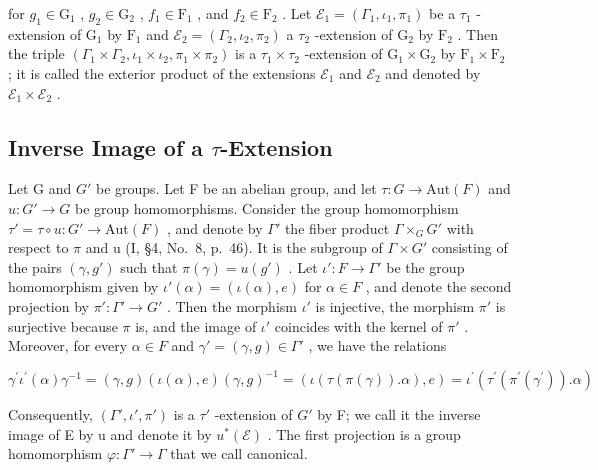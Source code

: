 for \(g_{1} \in \mathrm{G}_{1}\) , \(g_{2} \in \mathrm{G}_{2}\) , \(f_{1} \in \mathrm{F}_{1}\) , and \(f_{2} \in \mathrm{F}_{2}\) . Let \(\mathcal{E}_1 = (\Gamma_1, \iota_1, \pi_1)\) be a \(\tau_1\) -extension of \(\mathrm{G}_1\) by \(\mathrm{F}_1\) and \(\mathcal{E}_2 = (\Gamma_2, \iota_2, \pi_2)\) a \(\tau_2\) -extension of \(\mathrm{G}_2\) by \(\mathrm{F}_2\) . Then the triple \((\Gamma_1 \times \Gamma_2, \iota_1 \times \iota_2, \pi_1 \times \pi_2)\) is a \(\tau_1 \times \tau_2\) -extension of \(\mathrm{G}_1 \times \mathrm{G}_2\) by \(\mathrm{F}_1 \times \mathrm{F}_2\) ; it is called the exterior product of the extensions \(\mathcal{E}_1\) and \(\mathcal{E}_2\) and denoted by \(\mathcal{E}_1 \times \mathcal{E}_2\) .

\subsection{\texorpdfstring{Inverse Image of a \(\tau\)-Extension}{Inverse Image of a \textbackslash tau-Extension}}

Let G and \(G'\) be groups. Let F be an abelian group, and let \(\tau: G \to \text{Aut}(F)\) and \(u: G' \to G\) be group homomorphisms. Consider the group homomorphism \(\tau' = \tau \circ u: G' \to \text{Aut}(F)\) , and denote by \(\Gamma'\) the fiber product \(\Gamma \times_{G} G'\) with respect to \(\pi\) and u (I, §4, No.~8, p.~46). It is the subgroup of \(\Gamma \times G'\) consisting of the pairs \((\gamma, g')\) such that \(\pi(\gamma) = u(g')\) . Let \(\iota': F \to \Gamma'\) be the group homomorphism given by \(\iota'(\alpha) = (\iota(\alpha), e)\) for \(\alpha \in F\) , and denote the second projection by \(\pi': \Gamma' \to G'\) . Then the morphism \(\iota'\) is injective, the morphism \(\pi'\) is surjective because \(\pi\) is, and the image of \(\iota'\) coincides with the kernel of \(\pi'\) . Moreover, for every \(\alpha \in F\) and \(\gamma' = (\gamma, g) \in \Gamma'\) , we have the relations

\[
\gamma^ {\prime} \iota^ {\prime} (\alpha) \gamma^ {- 1} = (\gamma , g) (\iota (\alpha), e) (\gamma , g) ^ {- 1} = (\iota (\tau (\pi (\gamma)). \alpha), e) = \iota^ {\prime} (\tau^ {\prime} (\pi^ {\prime} (\gamma^ {\prime})). \alpha)
\]

Consequently, \((\Gamma', \iota', \pi')\) is a \(\tau'\) -extension of \(G'\) by F; we call it the inverse image of E by u and denote it by \(u^{*}(\mathcal{E})\) . The first projection is a group homomorphism \(\varphi : \Gamma' \to \Gamma\) that we call canonical.

